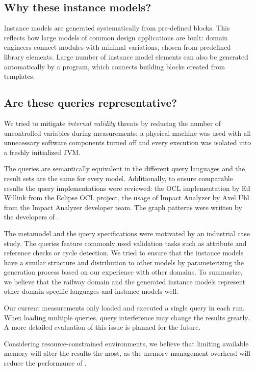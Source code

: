 \subsection{Why these instance models?}
Instance models are generated systematically from pre-defined blocks. This
reflects how large models of common design applications are built: domain
engineers connect modules with minimal variations, chosen from predefined
library elements. Large number of instance model elements can also be
generated automatically by a program, which connects building blocks created from
templates.

\subsection{Are these queries representative?}


We tried to mitigate \emph{internal validity} threats by reducing the number of
uncontrolled variables during measurements: a physical machine was used with all
unnecessary software components turned off and every execution was isolated into
a freshly initialized JVM.

The queries are semantically equivalent in the different query languages and the
result sets are the same for every model. Additionally, to ensure comparable
results the query implementations were reviewed: the OCL
implementation by Ed Willink from the Eclipse OCL project, the usage of Impact
Analyzer by Axel Uhl from the Impact Analyzer developer team. The graph patterns
were written by the developers of \incquery{}.

The metamodel and the query specifications were motivated by an industrial case
study. The queries feature commonly used validation tasks such as
attribute and reference checks or cycle detection. We tried to ensure that the
instance models have a similar structure and distribution to other models by
parameterizing the generation process based on our experience with other
domains. To summarize, we believe that the railway domain and the generated
instance models represent other domain-specific languages and instance
models well.

Our current measurements only loaded and executed a single query in each run.
When loading multiple queries, query interference may change the results
greatly. A more detailed evaluation of this issue is planned for the future.

Considering resource-constrained environments, we believe that limiting
available memory will alter the results the most, as the memory management
overhead will reduce the performance of \incquery{}.

